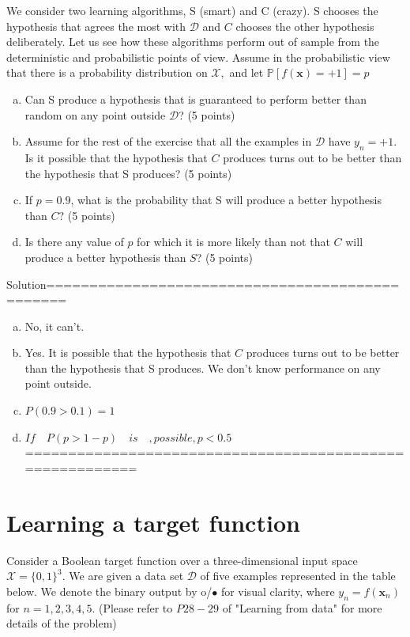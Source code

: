 \documentclass[11pt, a4paper]{article}
\begin{document}
We consider two learning algorithms, S (smart) and C (crazy). S chooses the hypothesis that agrees the most with $\mathcal{D}$ and $C$ chooses the other hypothesis deliberately. Let us see how these algorithms perform out of sample from the deterministic and probabilistic points of view. Assume in the probabilistic view that there is a probability distribution on $\mathcal{X},$ and let $\mathbb{P}[f(\mathbf{x})=+1]=p $
\begin{enumerate}[(a)]
\item Can S produce a hypothesis that is guaranteed to perform better than random on any point outside $\mathcal{D}$? (5 points)

\item Assume for the rest of the exercise that all the examples in $\mathcal{D}$ have $y_{n}=+1 .$ Is it possible that the hypothesis that $C$ produces turns out to be better than the hypothesis that S produces? (5 points)

\item If $p=0.9$, what is the probability that S will produce a better hypothesis than $C$? (5 points)

\item  Is there any value of $p$ for which it is more likely than not that $C$ will produce a better hypothesis than $S$? (5 points)
\end{enumerate}

Solution================================================
\begin{enumerate}[(a)]
	\item  No, it can't.
	\item  Yes. It is possible that the hypothesis that $C$ produces turns out to be better than the hypothesis that S produces.   We don't know performance on any point outside.
    \item  $P(0.9>0.1)=1$
	\item  $If \quad P(p>1-p) \quad is \quad,possible, p<0.5$
=========================================================
	\end{enumerate}



\section{Learning a target function}

Consider a Boolean target function over a three-dimensional input space $\mathcal{X} = \{0,1\}^3$. We are given a data set $\mathcal{D}$ of five examples represented in the table below. We denote the binary output by o/$\bullet$ for visual clarity, where $y_n = f(\mathbf{x}_n)$ for $n = 1,2,3,4,5$. (Please refer to $P28-29$ of "Learning from data" for more details of the problem)
\end{document}
